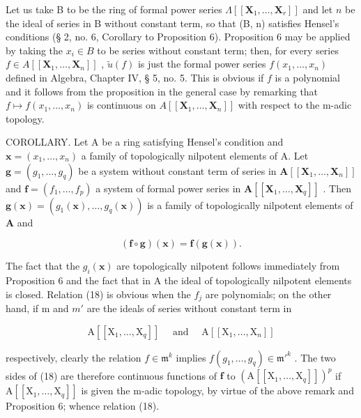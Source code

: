 Let us take B to be the ring of formal power series \(\Lambda[[\mathbf{X}_1,\ldots,\mathbf{X}_r]]\) and let \(n\) be the ideal of series in B without constant term, so that (B, n) satisfies Hensel's conditions (§ 2, no. 6, Corollary to Proposition 6). Proposition 6 may be applied by taking the \(x_i \in B\) to be series without constant term; then, for every series \(f \in A[[\mathbf{X}_1,\ldots,\mathbf{X}_n]]\) , \(\tilde{u}(f)\) is just the formal power series \(f(x_1,\ldots,x_n)\) defined in Algebra, Chapter IV, § 5, no. 5. This is obvious if \(f\) is a polynomial and it follows from the proposition in the general case by remarking that \(f \mapsto f(x_1,\ldots,x_n)\) is continuous on \(A[[\mathbf{X}_1,\ldots,\mathbf{X}_n]]\) with respect to the m-adic topology.

COROLLARY. Let A be a ring satisfying Hensel's condition and \(\mathbf{x} = (x_{1},\ldots ,x_{n})\) a family of topologically nilpotent elements of A. Let \(\mathbf{g} = (g_1,\dots,g_q)\) be a system without constant term of series in \(\mathbf{A}[[\mathbf{X}_1,\ldots ,\mathbf{X}_n]]\) and \(\mathbf{f} = (f_1,\dots,f_p)\) a system of formal power series in \(\mathbf{A}[[\mathbf{X}_1,\dots,\mathbf{X}_q]]\) . Then \(\mathbf{g}(\mathbf{x}) = (g_1(\mathbf{x}),\dots,g_q(\mathbf{x}))\) is a family of topologically nilpotent elements of \(\mathbf{A}\) and

\[
(\mathbf {f} \circ \mathbf {g}) (\mathbf {x}) = \mathbf {f} (\mathbf {g} (\mathbf {x})).\tag{18}
\]

The fact that the \(g_{i}(\mathbf{x})\) are topologically nilpotent follows immediately from Proposition 6 and the fact that in A the ideal of topologically nilpotent elements is closed. Relation (18) is obvious when the \(f_{j}\) are polynomials; on the other hand, if m and \(m'\) are the ideals of series without constant term in

\[
\mathrm{A} \left[ \left[ \mathrm{X} _ {1}, \dots , \mathrm{X} _ {q} \right] \right] \quad \text { and } \quad \mathrm{A} \left[ \left[ \mathrm{X} _ {1}, \dots , \mathrm{X} _ {n} \right] \right]
\]

respectively, clearly the relation \(f \in \mathfrak{m}^k\) implies \(f(g_1, \ldots, g_q) \in \mathfrak{m}'^k\) . The two sides of (18) are therefore continuous functions of \(\mathbf{f}\) to \((\mathrm{A}[[\mathrm{X}_1, \ldots, \mathrm{X}_q]])^p\) if \(\mathrm{A}[[\mathrm{X}_1, \ldots, \mathrm{X}_q]]\) is given the m-adic topology, by virtue of the above remark and Proposition 6; whence relation (18).

